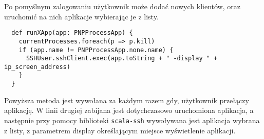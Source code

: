 \par

Po pomyślnym zalogowaniu użytkownik może dodać nowych klientów, oraz uruchomić na nich aplikacje wybierając je z listy.

\begin{lstlisting}
  def runXApp(app: PNPProcessApp) {
    currentProcesses.foreach(p => p.kill)
    if (app.name != PNPProcessApp.none.name) {
      SSHUser.sshClient.exec(app.toString + " -display " + ip_screen_address)
    }
  }
\end{lstlisting}

Powyższa metoda jest wywołana za każdym razem gdy, użytkownik przełączy aplikację. W linii drugiej zabijana jest dotychczasowo uruchomiona aplikacja, a następnie przy pomocy biblioteki \lstinline{scala-ssh} wywoływana jest aplikacja wybrana z listy, z parametrem display określającym miejsce wyświetlenie aplikacji.



